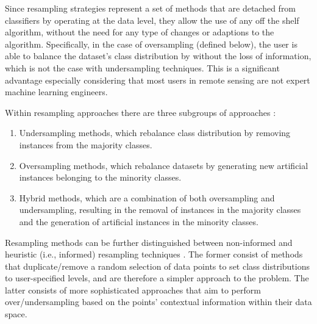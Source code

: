 \documentclass[preprint,12pt]{elsarticle}
\begin{document}
Since resampling strategies represent a set of methods that are detached from
classifiers by operating at the data level, they allow the use of any off the
shelf algorithm, without the need for any type of changes or adaptions to the
algorithm. Specifically, in the case of oversampling (defined below), the user
is able to balance the dataset's class distribution by without the loss of
information, which is not the case with undersampling techniques. This is a
significant advantage especially considering that most users in remote sensing
are not expert machine learning engineers. 

Within resampling approaches there are three subgroups of approaches
\cite{Fernandez2013,Kaur2019,Luengo2020}:

\begin{enumerate}
    \item Undersampling methods, which rebalance class distribution by removing
        instances from the majority classes.
    \item Oversampling methods, which rebalance datasets by generating new
        artificial instances belonging to the minority classes.
    \item Hybrid methods, which are a combination of both oversampling and
        undersampling, resulting in the removal of instances in the majority
        classes and the generation of artificial instances in the minority
        classes.
\end{enumerate}

Resampling methods can be further distinguished between non-informed and
heuristic (i.e., informed) resampling techniques
\cite{Fernandez2013,Luengo2020,Garcia2016}. The former consist of methods that
duplicate/remove a random selection of data points to set class distributions
to user-specified levels, and are therefore a simpler approach to the problem.
The latter consists of more sophisticated approaches that aim to perform
over/undersampling based on the points' contextual information within their
data space.
\end{document}

